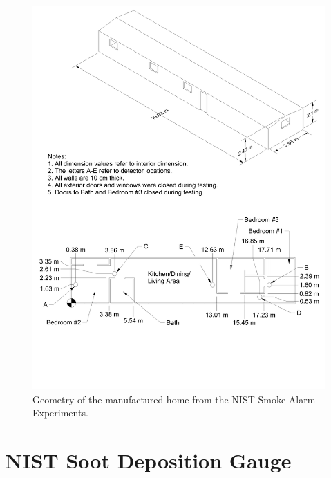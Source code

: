 \begin{figure}[p]
\includegraphics[width=\textwidth]{FIGURES/NIST_Smoke_Alarms/Manufactured_Home_Drawing}
\caption[Geometry of the manufactured home from the NIST Smoke Alarm Experiments]{Geometry of the manufactured home from the NIST Smoke Alarm Experiments.}
\label{NIST_Smoke_Alarms_Drawing}
\end{figure}

\FloatBarrier

\section{NIST Soot Deposition Gauge}
\label{NIST_SDG_Description}

